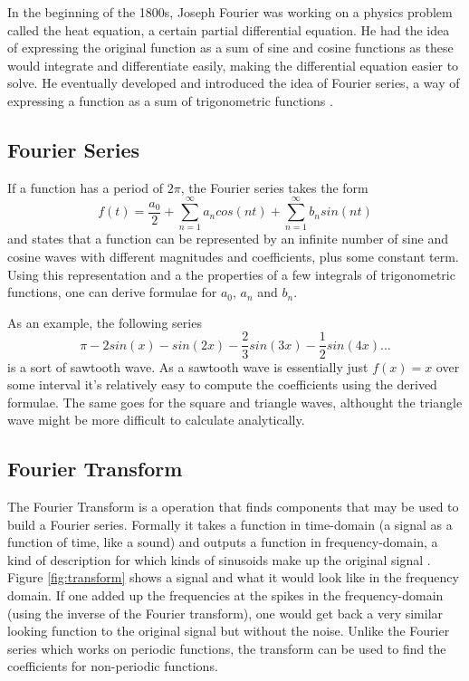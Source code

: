 In the beginning of the 1800s, Joseph Fourier was working on a physics problem called the heat equation, a certain partial differential equation. He had the idea of expressing the original function as a sum of sine and cosine functions as these would integrate and differentiate easily, making the differential equation easier to solve. He eventually developed and introduced the idea of Fourier series, a way of expressing a function as a sum of trigonometric functions \cite{Bounchaleun2019}.
\subsection{Fourier Series} 
If a function has a period of $2\pi$, the Fourier series takes the form $$f(t) = \frac{a_0}{2} + \sum_{n=1}^{\infty}a_ncos(nt)+\sum_{n=1}^{\infty}b_nsin(nt)$$ and states that a function can be represented by an infinite number of sine and cosine waves with different magnitudes and coefficients, plus some constant term. Using this representation and a the properties of a few integrals of trigonometric functions, one can derive formulae for $a_0$, $a_n$ and $b_n$.

As an example, the following series $$\pi -2sin(x) -sin(2x) -\frac{2}{3}sin(3x) -\frac{1}{2}sin(4x) ... $$ is a sort of sawtooth wave. As a sawtooth wave is essentially just $f(x) = x$ over some interval it's relatively easy to compute the coefficients using the derived formulae. The same goes for the square and triangle waves, althought the triangle wave might be more difficult to calculate analytically.
 
\subsection{Fourier Transform} 
The Fourier Transform is a operation that finds components that may be used to build a Fourier series. Formally it takes a function in time-domain (a signal as a function of time, like a sound) and outputs a function in frequency-domain, a kind of description for which kinds of sinusoids make up the original signal \cite{SimonXu2015}. Figure \ref{fig:transform} shows a signal and what it would look like in the frequency domain. If one added up the frequencies at the spikes in the frequency-domain (using the inverse of the Fourier transform), one would get back a very similar looking function to the original signal but without the noise. Unlike the Fourier series which works on periodic functions, the transform can be used to find the coefficients for non-periodic functions.

